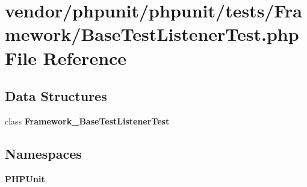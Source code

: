 \section{vendor/phpunit/phpunit/tests/\+Framework/\+Base\+Test\+Listener\+Test.php File Reference}
\label{_base_test_listener_test_8php}
\subsection*{Data Structures}
\begin{DoxyCompactItemize}
\item 
class {\bf Framework\+\_\+\+Base\+Test\+Listener\+Test}
\end{DoxyCompactItemize}
\subsection*{Namespaces}
\begin{DoxyCompactItemize}
\item 
 {\bf P\+H\+P\+Unit}
\end{DoxyCompactItemize}

